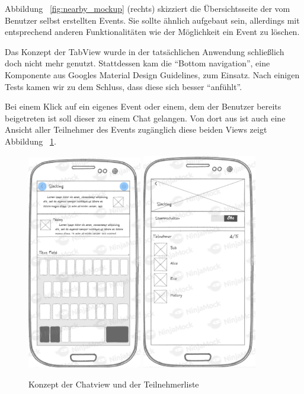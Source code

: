 \documentclass{scrartcl}
\begin{document}
Abbildung ~\ref{fig:nearby_mockup} (rechts) skizziert die Übersichtsseite der vom Benutzer selbst erstellten Events. Sie sollte ähnlich aufgebaut sein, allerdings mit entsprechend anderen Funktionalitäten wie der Möglichkeit ein Event zu löschen.


Das Konzept der TabView wurde in der tatsächlichen Anwendung schließlich doch nicht mehr genutzt. Stattdessen kam die \enquote{Bottom navigation}, eine Komponente aus Googles Material Design Guidelines, zum Einsatz. Nach einigen Tests kamen wir zu dem Schluss, dass diese sich besser \enquote{anfühlt}. 

Bei einem Klick auf ein eigenes Event oder einem, dem der Benutzer bereits beigetreten ist soll dieser zu einem Chat gelangen. Von dort aus ist auch eine Ansicht aller Teilnehmer des Events zugänglich diese beiden Views zeigt Abbildung ~\ref{fig:chat_mockup}.

\begin{figure}[h!tbp]
  \centering
  \includegraphics[width=5cm]{img/chat_mockup}
  \hspace{1cm}
  \includegraphics[width=5cm]{img/groupview_mockup}
  \caption{Konzept der Chatview und der Teilnehmerliste}\label{fig:chat_mockup}
\end{figure}
\end{document}
